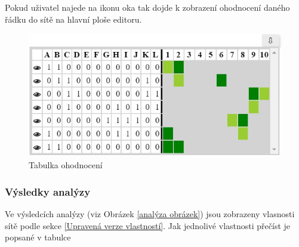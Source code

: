 \documentclass[
  biblatex,
  glossaries,
  index
]{kidiplom}
\begin{document}
Pokud uživatel najede na ikonu oka tak dojde k zobrazení ohodnocení 
daného řádku do sítě na hlavní ploše editoru.

\begin{figure}[h]
  \centering
  \includegraphics[width=\linewidth]{tabulka}
  \caption{Tabulka ohodnocení}\label{fig:Tabulka ohodnocení obrázek}
\end{figure}


\subsubsection{Výsledky analýzy}\label{výsledky analýzy}

Ve výsledcích analýzy (viz Obrázek \ref{analýza obrázek}) jsou zobrazeny vlasnosti sítě podle sekce \ref{Upravená verze vlastností}.
Jak jednolivé vlastnosti přečíst je popsané v tabulce 
\end{document}
